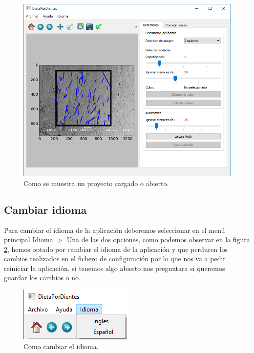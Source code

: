 \documentclass[13pt]{book}              %
\begin{document}
{\begin{figure}[h]
\centering
\includegraphics[width=.99\textwidth]{proyectoAbierto}
\caption{Como se muestra un proyecto cargado o abierto.}
\label{fig:proyectoAbierto}
\end{figure}

\label{modo:idioma}
\subsection{Cambiar idioma}
Para cambiar el idioma de la aplicación deberemos seleccionar en el menú principal Idioma $>$ Una de las dos opciones, como podemos observar en la figura \ref{fig:camb}, hemos optado por cambiar el idioma de la aplicación y que perduren los cambios realizados en el fichero de configuración por lo que nos va a pedir reiniciar la aplicación, si tenemos algo abierto nos preguntara si queremos guardar los cambios o no.

\begin{figure}[h]
\centering
\includegraphics[width=.55\textwidth]{CambiarIdioma}
\caption{Como cambiar el idioma.}
\label{fig:camb}
\end{figure}

}
\end{document}
